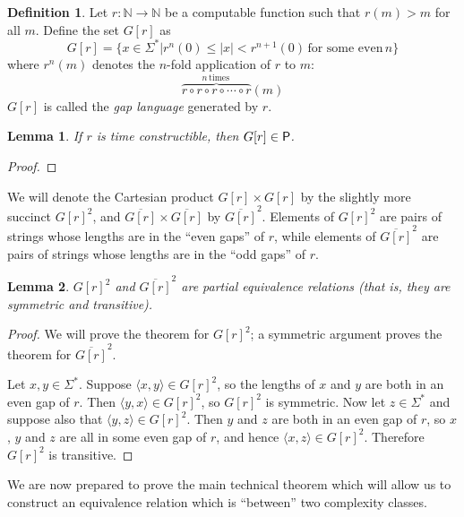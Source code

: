 \documentclass{article}
\newtheorem{lemma}[lemma]{Lemma}
\theoremstyle{definition} \newtheorem{definition}[definition]{Definition}
\newcommand{\plain}[1]{\,\text{#1}\,} %
\newcommand{\defn}[1]{\emph{#1}} %
\newcommand{\pair}[2]{\langle#1,#2\rangle} %
\begin{document}
\begin{definition}
  Let $r\colon\mathbb{N}\to\mathbb{N}$ be a computable function such that $r(m)>m$ for all $m$.
  Define the set $G[r]$ as
  \begin{displaymath}
    G[r]=\{x\in\Sigma^*|r^n(0)\leq|x|<r^{n+1}(0) \plain{for some even} n\}
  \end{displaymath}
  where $r^n(m)$ denotes the $n$-fold application of $r$ to $m$:
  \begin{displaymath}
    \overbrace{r\circ r\circ r\circ\cdots\circ r}^{n \plain{times}}(m)
  \end{displaymath}
  $G[r]$ is called the \defn{gap language} generated by $r$.
\end{definition}

\begin{lemma}\label{lem:gap_p}
  If $r$ is time constructible, then $G[r]\in\P$.
\end{lemma}
\begin{proof}
\end{proof}

We will denote the Cartesian product $G[r]\times G[r]$ by the slightly more succinct ${G[r]}^2$, and $\overline{G[r]}\times\overline{G[r]}$ by $\overline{G[r]}^2$.
Elements of ${G[r]}^2$ are pairs of strings whose lengths are in the ``even gaps'' of $r$, while elements of $\overline{G[r]}^2$ are pairs of strings whose lengths are in the ``odd gaps'' of $r$.

\begin{lemma}
  ${G[r]}^2$ and $\overline{G[r]}^2$ are \defn{partial equivalence relations} (that is, they are symmetric and transitive).
\end{lemma}
\begin{proof}
  We will prove the theorem for ${G[r]}^2$; a symmetric argument proves the theorem for $\overline{G[r]}^2$.

  Let $x,y\in\Sigma^*$.
  Suppose $\pair{x}{y}\in {G[r]}^2$, so the lengths of $x$ and $y$ are both in an even gap of $r$.
  Then $\pair{y}{x}\in{G[r]}^2$, so ${G[r]}^2$ is symmetric.
  Now let $z\in\Sigma^*$ and suppose also that $\pair{y}{z}\in {G[r]}^2$.
  Then $y$ and $z$ are both in an even gap of $r$, so $x$, $y$ and $z$ are all in some even gap of $r$, and hence $\pair{x}{z}\in {G[r]}^2$.
  Therefore ${G[r]}^2$ is transitive.
\end{proof}

We are now prepared to prove the main technical theorem which will allow us to construct an equivalence relation which is ``between'' two complexity classes.
\end{document}
